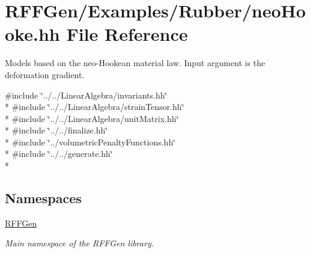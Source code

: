 \hypertarget{neoHooke_8hh}{\section{R\-F\-F\-Gen/\-Examples/\-Rubber/neo\-Hooke.hh File Reference}
\label{neoHooke_8hh}
}


Models based on the neo-\/\-Hookean material law. Input argument is the deformation gradient.  


{\ttfamily \#include \char`\"{}../../\-Linear\-Algebra/invariants.\-hh\char`\"{}}\\*
{\ttfamily \#include \char`\"{}../../\-Linear\-Algebra/strain\-Tensor.\-hh\char`\"{}}\\*
{\ttfamily \#include \char`\"{}../../\-Linear\-Algebra/unit\-Matrix.\-hh\char`\"{}}\\*
{\ttfamily \#include \char`\"{}../../finalize.\-hh\char`\"{}}\\*
{\ttfamily \#include \char`\"{}../volumetric\-Penalty\-Functions.\-hh\char`\"{}}\\*
{\ttfamily \#include \char`\"{}../../generate.\-hh\char`\"{}}\\*
\subsection*{Namespaces}
\begin{DoxyCompactItemize}
\item 
\hyperlink{namespaceRFFGen}{R\-F\-F\-Gen}
\begin{DoxyCompactList}\small\item\em Main namespace of the R\-F\-F\-Gen library. \end{DoxyCompactList}\end{DoxyCompactItemize}
